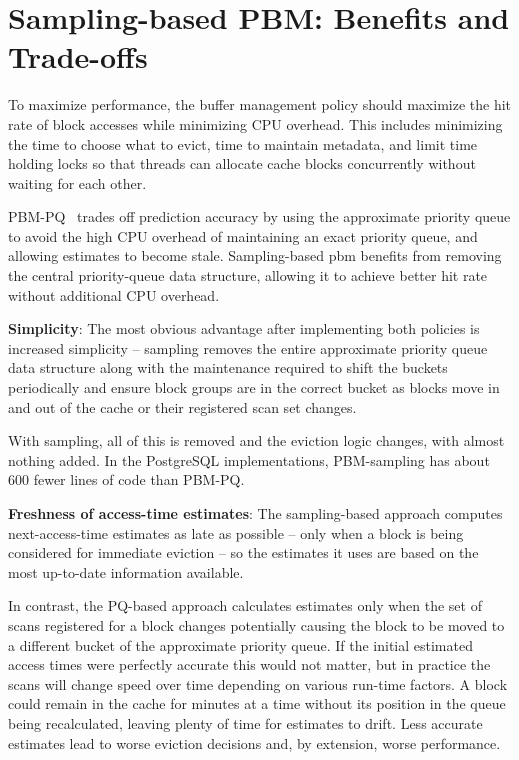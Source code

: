 \section{Sampling-based PBM: Benefits and Trade-offs\label{sec:sampling-advantages}}

To maximize performance, the buffer management policy should maximize the hit rate of block accesses while minimizing CPU overhead. This includes minimizing the time to choose what to evict, time to maintain metadata, and limit time holding locks so that threads can allocate cache blocks concurrently without waiting for each other.

PBM-PQ~\cite{pbm} trades off prediction accuracy by using the approximate priority queue to avoid the high CPU overhead of maintaining an exact priority queue, and allowing estimates to become stale. Sampling-based \gls{pbm} benefits from removing the central priority-queue data structure, allowing it to achieve better hit rate without additional CPU overhead.


\textbf{Simplicity}: The most obvious advantage after implementing both policies is increased simplicity -- sampling removes the entire approximate priority queue data structure along with the maintenance required to shift the buckets periodically and ensure block groups are in the correct bucket as blocks move in and out of the cache or their registered scan set changes.

With sampling, all of this is removed and the eviction logic changes, with almost nothing added. In the PostgreSQL implementations, PBM-sampling has about 600 fewer lines of code than PBM-PQ.


\textbf{Freshness of access-time estimates}: The sampling-based approach computes next-access-time estimates as late as possible -- only when a block is being considered for immediate eviction -- so the estimates it uses are based on the most up-to-date information available.

In contrast, the PQ-based approach calculates estimates only when the set of scans registered for a block changes potentially causing the block to be moved to a different bucket of the approximate priority queue. If the initial estimated access times were perfectly accurate this would not matter, but in practice the scans will change speed over time depending on various run-time factors. A block could remain in the cache for minutes at a time without its position in the queue being recalculated, leaving plenty of time for estimates to drift. Less accurate estimates lead to worse eviction decisions and, by extension, worse performance.

